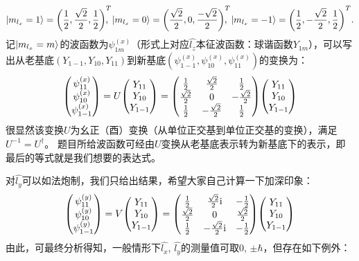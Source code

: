 \begin{enumerate}[label=2.\arabic*, leftmargin=-0.5mm]
\[
\ket{m_{l_x}=1}=\qty(\frac{1}{2},\frac{\sqrt{2}}{2},\frac{1}{2})^T\!\!\!\!,\;
\ket{m_{l_x}=0}=\qty(\frac{\sqrt{2}}{2},0,\frac{-\sqrt{2}}{2})^T\!\!\!\!,\;
\ket{m_{l_x}=-1}=\qty(\frac{1}{2},-\frac{\sqrt{2}}{2},\frac{1}{2})^T.
\]
记$\ket{m_{l_x}=m}$的波函数为$\psi^{(x)}_{1m}$（形式上对应$\hat{l_z}$本征波函数：球谐函数$Y_{1m}$），可以写出从老基底$(Y_{1-1},Y_{10},Y_{11})$到新基底$(\psi^{(x)}_{1-1},\psi^{(x)}_{10},\psi^{(x)}_{11})$的变换为：
\[\mqty(\psi^{(x)}_{11}\\\psi^{(x)}_{10}\\\psi^{(x)}_{1-1}) = U \mqty(Y_{11}\\Y_{10}\\Y_{1-1}) =
\mqty(\frac{1}{2}&\frac{\sqrt{2}}{2}&\frac{1}{2}\\
\frac{\sqrt{2}}{2}&0&-\frac{\sqrt{2}}{2}\\
\frac{1}{2}&-\frac{\sqrt{2}}{2}&\frac{1}{2})
\mqty(Y_{11}\\Y_{10}\\Y_{1-1})\]
很显然该变换$U$为幺正（酉）变换（从单位正交基到单位正交基的变换），满足$U^{-1}=U^\dagger$。
题目所给波函数可经由$U$变换从老基底表示转为新基底下的表示，即
最后的等式就是我们想要的表达式。

对$\hat{l_y}$可以如法炮制，我们只给出结果，希望大家自己计算一下加深印象：
\[\mqty(\psi^{(y)}_{11}\\\psi^{(y)}_{10}\\\psi^{(y)}_{1-1}) = V \mqty(Y_{11}\\Y_{10}\\Y_{1-1}) =
\mqty(\frac{1}{2}&\frac{\sqrt{2}}{2}\im&-\frac{1}{2}\\
\frac{\sqrt{2}}{2}&0&\frac{\sqrt{2}}{2}\\
\frac{1}{2}&-\frac{\sqrt{2}}{2}\im&-\frac{1}{2})
\mqty(Y_{11}\\Y_{10}\\Y_{1-1})\]
由此，可最终分析得知，一般情形下$\hat{l_x}$, $\hat{l_y}$的测量值可取0, $\pm\hbar$，但存在如下例外：


\end{enumerate}
